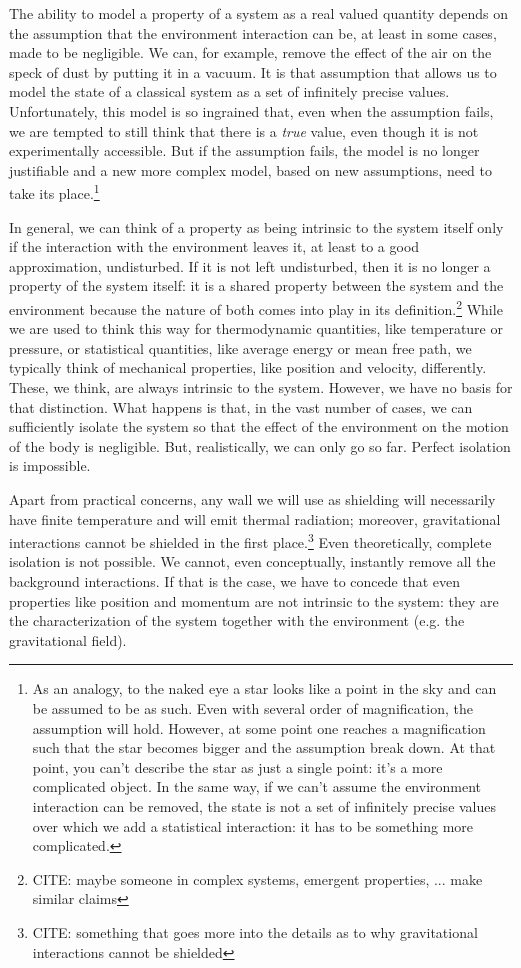 \documentclass[10pt,twocolumn, nofootinbib]{revtex4-2}
\begin{document}
The ability to model a property of a system as a real valued quantity depends on the assumption that the environment interaction can be, at least in some cases, made to be negligible. We can, for example, remove the effect of the air on the speck of dust by putting it in a vacuum. It is that assumption that allows us to model the state of a classical system as a set of infinitely precise values. Unfortunately, this model is so ingrained that, even when the assumption fails, we are tempted to still think that there is a \emph{true} value, even though it is not experimentally accessible. But if the assumption fails, the model is no longer justifiable and a new more complex model, based on new assumptions, need to take its place.\footnote{As an analogy, to the naked eye a star looks like a point in the sky and can be assumed to be as such. Even with several order of magnification, the assumption will hold. However, at some point one reaches a magnification such that the star becomes bigger and the assumption break down. At that point, you can't describe the star as just a single point: it's a more complicated object. In the same way, if we can't assume the environment interaction can be removed, the state is not a set of infinitely precise values over which we add a statistical interaction: it has to be something more complicated.}

In general, we can think of a property as being intrinsic to the system itself only if the interaction with the environment leaves it, at least to a good approximation, undisturbed. If it is not left undisturbed, then it is no longer a property of the system itself: it is a shared property between the system and the environment because the nature of both comes into play in its definition.\footnote{CITE: maybe someone in complex systems, emergent properties, ... make similar claims} While we are used to think this way for thermodynamic quantities, like temperature or pressure, or statistical quantities, like average energy or mean free path, we typically think of mechanical properties, like position and velocity, differently. These, we think, are always intrinsic to the system. However, we have no basis for that distinction. What happens is that, in the vast number of cases, we can sufficiently isolate the system so that the effect of the environment on the motion of the body is negligible. But, realistically, we can only go so far. Perfect isolation is impossible.

Apart from practical concerns, any wall we will use as shielding will necessarily have finite temperature and will emit thermal radiation; moreover, gravitational interactions cannot be shielded in the first place.\footnote{CITE: something that goes more into the details as to why gravitational interactions cannot be shielded} Even theoretically, complete isolation is not possible. We cannot, even conceptually, instantly remove all the background interactions. If that is the case, we have to concede that even properties like position and momentum are not intrinsic to the system: they are the characterization of the system together with the environment (e.g. the gravitational field).
\end{document}
